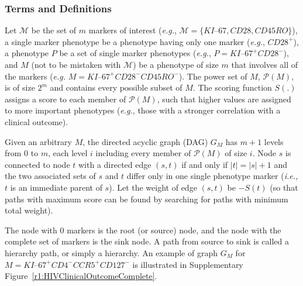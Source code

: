 \subsubsection{Terms and Definitions}

Let $\mathcal{M}$ be the set of $m$ markers of interest (\emph{e.g.}, $\mathcal{M}=\{KI\mbox{--}67,CD28,CD45RO\}$), a
single marker phenotype be a phenotype having only one marker (\emph{e.g.}, $CD28^+$), a phenotype $P$ be a set of single
marker phenotypes (\emph{e.g.}, $P=KI\mbox{--}67^+CD28^-$), and $M$ (not to be mistaken with $\mathcal{M}$) be a phenotype of size $m$ that involves all of the
markers (\emph{e.g.} $M=KI\mbox{--}67^+CD28^-CD45RO^-$).  The power set of $M$, $\mathcal{P}(M)$, is of size $2^m$ and contains every possible subset of $M$.  
The scoring function $S(.)$ assigns a score to each member of $\mathcal{P}(M)$, such that higher values are assigned to more important phenotypes (\emph{e.g.}, those with a stronger correlation with a clinical outcome). 

Given an arbitrary $M$, the  directed acyclic  graph (DAG)  $G_M$ has $m + 1$ levels from $0$ to $m$, each level $i$ including every
member of $\mathcal{P}(M)$ of size $i$.  Node $s$ is connected to node $t$ with a directed edge $(s,t)$ if and only if
$|t|=|s|+1$ and the two associated sets of $s$ and $t$ differ only in one single phenotype marker (\emph{i.e.,} $t$ is
an immediate parent of $s$).  
Let the weight of edge $(s,t)$ be $-S(t)$ (so that paths with maximum score can be found by searching for paths with minimum total weight). 


The node with $0$ markers is the root (or source) node, and the node with the complete set of markers is the sink node. 
A path from source to sink is called a hierarchy path, or simply a hierarchy. 
An example of graph $G_M$ for $M = KI\mbox{--}67^+CD4^-CCR5^+CD127^-$ is
illustrated in Supplementary Figure~\ref{r1:HIVClinicalOutcomeComplete}.

